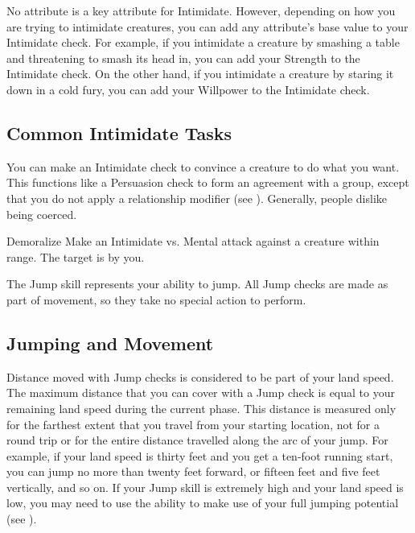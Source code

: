         No attribute is a key attribute for Intimidate.
        However, depending on how you are trying to intimidate creatures, you can add any attribute's base value to your Intimidate check.
        For example, if you intimidate a creature by smashing a table and threatening to smash its head in, you can add your Strength to the Intimidate check.
        On the other hand, if you intimidate a creature by staring it down in a cold fury, you can add your Willpower to the Intimidate check.

    \subsection{Common Intimidate Tasks}
         You can make an Intimidate check to convince a creature to do what you want. This functions like a Persuasion check to form an agreement with a group, except that you do not apply a relationship modifier (see ).
        Generally, people dislike being coerced.
        \begin{freeability}{Demoralize}
            Make an Intimidate vs. Mental attack against a creature within \rngmed range.
            \hit The target is  \shaken by you.
        \end{freeability}

\newpage
{}
    The Jump skill represents your ability to jump.
    All Jump checks are made as part of movement, so they take no special action to perform.

    \subsection{Jumping and Movement}
    Distance moved with Jump checks is considered to be part of your land speed.
    The maximum distance that you can cover with a Jump check is equal to your remaining land speed during the current phase.
    This distance is measured only for the farthest extent that you travel from your starting location, not for a round trip or for the entire distance travelled along the arc of your jump.
    For example, if your land speed is thirty feet and you get a ten-foot running start, you can jump no more than twenty feet forward, or fifteen feet and five feet vertically, and so on.
    If your Jump skill is extremely high and your land speed is low, you may need to use the  ability to make use of your full jumping potential (see ).

